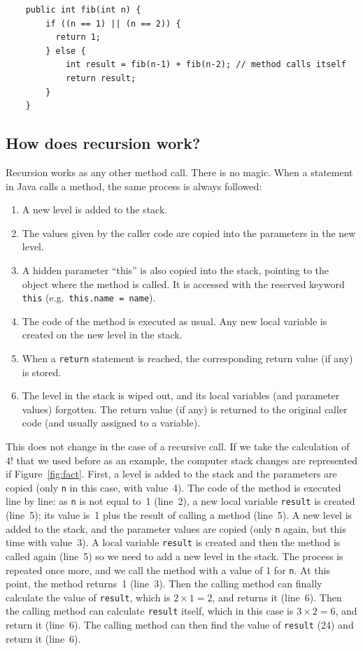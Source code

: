 \begin{verbatim}
    public int fib(int n) {
        if ((n == 1) || (n == 2)) {
          return 1; 
        } else {
            int result = fib(n-1) + fib(n-2); // method calls itself
            return result;
        }
    }
\end{verbatim}

\subsection{How does recursion work?}
\label{sec:how-does-recursion}

Recursion works as any other method call. There is no magic. When a
statement in Java calls a method, the same process is always 
followed: 

\begin{enumerate}
\item A new level is added to the stack.
\item The values given by the caller code are copied into the
  parameters in the new level.
\item A hidden parameter ``this'' is also copied into the stack,
  pointing to the object where the method is called. It is accessed
  with the reserved keyword \verb+this+ (e.g.~\verb+this.name = name+).
\item The code of the method is executed as usual. Any new local
  variable is created on the new level in the stack. 
\item When a \verb+return+ statement is reached, the corresponding
  return value (if any) is stored.
\item The level in the stack is wiped out, and its local variables
  (and parameter values) forgotten. The return value (if any) is
  returned to the original caller code (and usually assigned to a
  variable).
\end{enumerate}

This does not change in the case of a recursive call. If we take the
calculation of 4! that we used before as an example, 
the computer stack changes are
represented if Figure~\ref{fig:fact}. First, a level is added to the
stack and the parameters are copied (only \verb+n+ in this case, with
value~4). The code of the method is executed line by line: as \verb+n+
is not equal to~1 (line~2), 
a new local variable \verb+result+ is created (line~5); its value
is~1 plus the result of calling a method (line~5). 
A new level is added to the
stack, and the parameter values are copied (only \verb+n+ again, but
this time with value~3). A local variable \verb+result+ is created and
then the method is called again (line~5) 
so we need to add a new level in the
stack. The process is repeated once more, and we call the method with
a value of 1 for \verb+n+. At this point, 
the method returns~1 (line~3). Then
the calling method can finally calculate the value of \verb+result+,
which is $2 \times 1 = 2$, and returns it (line~6). 
Then the calling method can
calculate \verb+result+ itself, which in this case is $3 \times 2 = 6$,
and return it (line~6). The calling method can then find the value of
\verb+result+ (24) and return it (line~6). 


